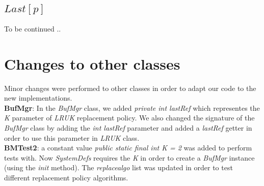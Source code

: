 \documentclass{article}
\begin{document}
\subsection{$Last[p]$}
To be continued ..

\section{Changes to other classes}
Minor changes were performed to other classes in order to adapt our code to the new implementations.\\
\textbf{BufMgr}: In the \textit{BufMgr} class, we added \textit{private int lastRef} which representes the \textit{K} parameter of \textit{LRUK} replacement policy. We also changed the signature of the \textit{BufMgr} class by adding the \textit{int lastRef} parameter and added a \textit{lastRef} getter in order to use this parameter in \textit{LRUK} class.\\
\textbf{BMTest2}: a constant value \textit{public static final int K = 2} was added to perform tests with. Now  \textit{SystemDefs} requires the \textit{K} in order to create a \textit{BufMgr} instance (using the \textit{init} method). The \textit{replacealgo} list was updated in order to test different replacement policy algorithms.\\




\end{document}

